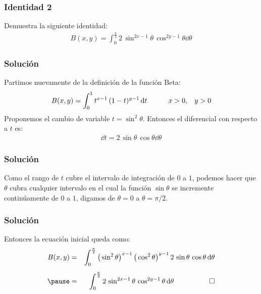 \documentclass[12pt]{beamer}
\begin{document}
\begin{frame}
\frametitle{Identidad 2}
Demuestra la siguiente identidad:
\begin{align*}
B(x, y) = \int_{0}^{\frac{\pi}{2}} 2 \, \sin^{2x-1} \theta \, \cos^{2y-1} \theta \dd{\theta}
\end{align*} 
\end{frame}
\begin{frame}
\frametitle{Solución}
Partimos nuevamente de la definición de la función Beta:
\begin{align*}
B(x, y) = \int_{0}^{1} t^{x-1} \, (1 - t)^{y-1} \dd{t} \hspace{1cm} x > 0, \hspace{0.3cm} y > 0
\end{align*}
\pause
Proponemos el cambio de variable $t = \sin^{2} \theta$. \pause Entonces el diferencial con respecto a $t$ es:
\begin{align*}
\dd{t} = 2 \, \sin \theta \, \cos \theta \dd{\theta}
\end{align*}
\end{frame}
\begin{frame}
\frametitle{Solución}
Como el rango de $t$ cubre el intervalo de integración de $0$ a $1$, \pause podemos hacer que $\theta$ cubra cualquier intervalo en el cual la función $\sin \theta$ se incremente continúamente de $0$ a $1$, digamos de $\theta = 0$ a $\theta = \pi/2$.
\end{frame}
\begin{frame}
\frametitle{Solución}
Entonces la ecuación inicial queda como:
\begin{eqnarray*}
B(x, y) &=& \int_{0}^{\frac{\pi}{2}} \big( \sin^{2} \theta \big)^{x-1} \, \big( \cos^{2} \theta \big)^{y-1} \, 2 \, \sin \theta \, \cos \theta \dd{\theta} \\[0.5em] \pause
&=& \int_{0}^{\frac{\pi}{2}} 2 \, \sin^{2x -1} \theta \, \cos^{2y-1} \theta \dd{\theta} \hspace{1cm} \qed
\end{eqnarray*}
\end{frame}
\end{document}
